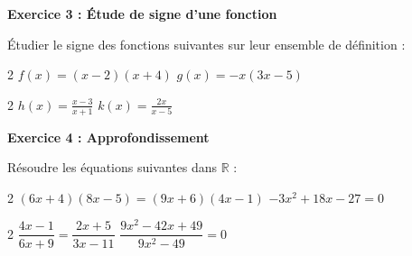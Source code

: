 \documentclass[12pt,a4paper]{exam}
\begin{document}
\vspace{10pt}

\noindent
\textbf{Exercice 3 : Étude de signe d’une fonction}

\vspace{5pt}
Étudier le signe des fonctions suivantes sur leur ensemble de définition :
\vspace{-5pt}
\begin{questions}
\begin{multicols}{2}
    \question $f(x)=(x-2)(x+4)$
    \question $g(x)=-x(3x-5)$
\end{multicols}
\vspace{5pt}
\begin{multicols}{2}
    \question $\displaystyle h(x)=\frac{x-3}{x+1}$
    \question $\displaystyle k(x)=\frac{2x}{x-5}$
\end{multicols}
\end{questions}

\vspace{10pt}

\noindent
\textbf{Exercice 4 : Approfondissement}

\vspace{5pt}
Résoudre les équations suivantes dans $\mathbb{R}$ :
\vspace{-5pt}
\begin{questions}
\begin{multicols}{2}
    \question $(6x+4)(8x-5) = (9x+6)(4x-1)$
    \question $-3x^2+18x-27=0$
\end{multicols}
\vspace{5pt}
\begin{multicols}{2}
    \question $\dfrac{4x-1}{6x+9} = \dfrac{2x+5}{3x-11}$
    \question $\dfrac{9x^2-42x+49}{9x^2-49} = 0$
\end{multicols}
\end{questions}
\end{document}

